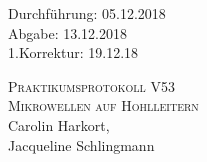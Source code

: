 

\begin{titlepage}
  \begin{flushleft}
 Durchführung: 05.12.2018\\
 Abgabe: 13.12.2018\\
 1.Korrektur: 19.12.18\\
  \end{flushleft}



 \begin{center}


\textsc{\LARGE Praktikumsprotokoll V53}\\[1.5cm]
\textsc{\huge Mikrowellen auf Hohlleitern} \\[5,5cm]

Carolin Harkort\footnotemark[1], \\
Jacqueline Schlingmann\footnotemark[2] \\[1,0cm]



 \end{center}

 \vfill

\end{titlepage}


  
  

\nocite{*}
\printbibliography

